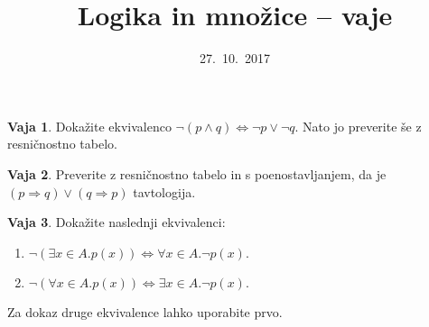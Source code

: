 \documentclass{article}
\newcommand{\lthen}{\Rightarrow}
\theoremstyle{definition}
\newtheorem{vaja}{Vaja}
\begin{document}
\title{Logika in množice -- vaje}
\date{27.~10.~2017}
\maketitle

\begin{vaja}
  Dokažite ekvivalenco $\lnot (p \land q) \iff \lnot p \lor \lnot q$.
  Nato jo preverite še z resničnostno tabelo.
\end{vaja}

\begin{vaja}
  Preverite z resničnostno tabelo in s
  poenostavljanjem, da je $(p \lthen q) \lor (q \lthen p)$ tavtologija.
\end{vaja}

\begin{vaja}
  Dokažite naslednji ekvivalenci:
  \begin{enumerate}
  \item  %
    $\lnot (\exists x \in A . p(x))
    \iff
    \forall x \in A . \lnot p(x).$
  \item
  $
    \lnot (\forall x \in A . p(x))
    \iff
    \exists x \in A . \lnot p(x).
  $
  \end{enumerate}
  Za dokaz druge ekvivalence lahko uporabite prvo.
\end{vaja}
\end{document}
